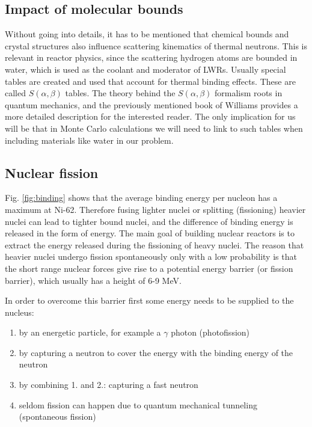 \subsection{Impact of molecular bounds}

Without going into details, it has to be mentioned that chemical bounds and crystal structures also influence scattering kinematics of thermal neutrons. This is relevant in reactor physics, since the scattering hydrogen atoms are bounded in water, which is used as the coolant and moderator of LWRs. Usually special tables are created and used that account for thermal binding effects. These are called $S(\alpha,\beta)$ tables. The theory behind the $S(\alpha,\beta)$ formalism roots in quantum mechanics, and the previously mentioned book of Williams provides a more detailed description for the interested reader. The only implication for us will be that in Monte Carlo calculations we will need to link to such tables when including materials like water in our problem.


\subsection{Nuclear fission}

Fig. \ref{fig:binding} shows that the average binding energy per nucleon has a maximum at Ni-62. Therefore fusing lighter nuclei or splitting (fissioning) heavier nuclei can lead to tighter bound nuclei, and the difference of binding energy is released in the form of energy. The main goal of building nuclear reactors is to extract the energy released during the fissioning of heavy nuclei. The reason that heavier nuclei undergo fission spontaneously only with a low probability is that the short range nuclear forces give rise to a potential energy barrier (or fission barrier), which usually has a height of 6-9 MeV. 

In order to overcome this barrier first some energy needs to be supplied to the nucleus:

\begin{enumerate}
\item by an energetic particle, for example a $\gamma$ photon (photofission)
\item by capturing a neutron to cover the energy with the binding energy of the neutron
\item by combining 1. and 2.: capturing a fast neutron
\item seldom fission can happen due to quantum mechanical tunneling (spontaneous fission)
\end{enumerate}

